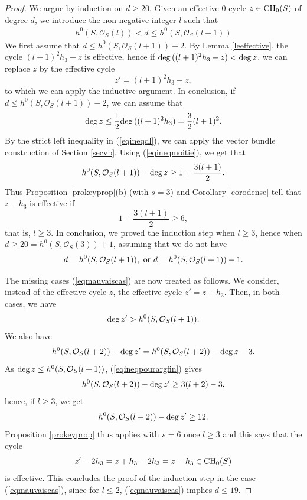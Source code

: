\documentclass[10pt]{article}
\begin{document}
\begin{proof} We argue by induction on $d\geq 20$. Given an effective $0$-cycle $z\in{\rm CH}_0(S)$ of degree $d$, we introduce the non-negative integer $l$ such that
\begin{eqnarray}\label{eqineqdl}  h^0(S,\mathcal{O}_S(l))< d\leq  h^0(S,\mathcal{O}_S(l+1))\end{eqnarray}
We first assume that $d\leq  h^0(S,\mathcal{O}_S(l+1))-2$. By Lemma \ref{leeffective}, the cycle
$(l+1)^2h_3-z$ is effective, hence if
${\rm deg}\,((l+1)^2h_3-z)< {\rm deg}\,z$, we can replace $z$ by the effective cycle  $$z'=(l+1)^2h_3-z,$$ to which we can apply the inductive argument. In conclusion, if $d\leq  h^0(S,\mathcal{O}_S(l+1))-2$, we can assume that
\begin{eqnarray}\label{eqineqmoitie} {\rm deg}\,z\leq \frac{1}{2} {\rm deg}\,((l+1)^2h_3)=\frac{3}{2} (l+1)^2.\end{eqnarray}
By the strict  left inequality in (\ref{eqineqdl}), we can apply the
 vector bundle construction  of Section \ref{secvb}. Using (\ref{eqineqmoitie}), we get that
$$h^0(S,\mathcal{O}_S(l+1))-{\rm deg}\,z\geq 1+\frac{3(l+1)}{2}.$$
Thus Proposition \ref{prokeyprop}(b) (with $s=3$) and  Corollary  \ref{corodense} tell that $z-h_3$ is effective if  $$1+\frac{3(l+1)}{2}\geq 6,$$ that is, $l\geq 3$. In conclusion, we  proved the induction step when
  $l\geq 3$, hence when $d\geq 20=h^0(S,\mathcal{O}_S(3))+1$, assuming   that we do not have
\begin{eqnarray}\label{eqmauvaiscas} d=  h^0(S,\mathcal{O}_S(l+1)),\,\,{\rm  or} \,\,d=h^0(S,\mathcal{O}_S(l+1))-1. \end{eqnarray}


The missing  cases (\ref{eqmauvaiscas}) are now  treated as follows.
We consider, instead of the effective  cycle $z$, the  effective cycle $z'=z+h_3$. Then, in both cases, we have \begin{eqnarray}\label{eqpourpropext} {\rm deg}\,z'>h^0(S,\mathcal{O}_S(l+1)).
\end{eqnarray} We also have
\begin{eqnarray}\label{eqineqpourargfin} h^0(S,\mathcal{O}_{S}(l+2))-{\rm deg}\,z'=h^0(S,\mathcal{O}_S(l+2))-{\rm deg}\,z-3.\end{eqnarray}
As ${\rm deg}\,z\leq  h^0(S,\mathcal{O}_S(l+1))$, (\ref{eqineqpourargfin})  gives
$$ h^0(S,\mathcal{O}_{S}(l+2))-{\rm deg}\,z'\geq 3(l+2)-3,
$$
hence, if $l\geq 3$, we get
 \begin{eqnarray}\label{eqineqpourcaspenible}h^0(S,\mathcal{O}_{S}(l+2))-{\rm deg}\,z'\geq 12.\end{eqnarray}
Proposition \ref{prokeyprop} thus applies with $s=6$ once $l\geq 3$ and this says that the cycle $$z'-2h_3=z+h_3-2h_3=z-h_3\in{\rm CH}_0(S)$$
is effective. This  concludes the proof  of the induction step in the case (\ref{eqmauvaiscas}), since for $l\leq 2$, (\ref{eqmauvaiscas}) implies $d\leq 19$.
\end{proof}
\end{document}
